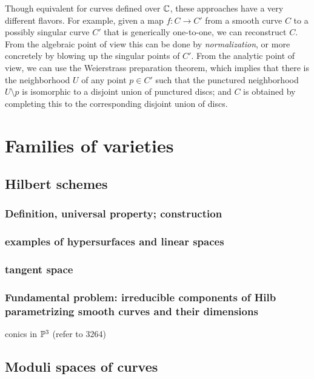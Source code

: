 Though equivalent for curves defined over ${\mathbb C}$, these approaches have a very different flavors. For example,
given a map  $f: C\to C'$ from a smooth curve $C$ to a possibly singular curve $C'$ that is generically one-to-one, we can reconstruct $C$.
From the algebraic point of view this can be done by \emph{normalization}, or more concretely by blowing up the singular points of $C'$. From the analytic point of view, we can use the Weierstrass preparation theorem, which implies that there is the neighborhood $U$ of any point $p\in C'$ such that the punctured neighborhood $U \setminus p$ is isomorphic to a disjoint union of punctured discs; and $C$ is obtained by completing this to the corresponding disjoint union of discs.

\section{Families of varieties}

\subsection{Hilbert schemes}

\subsubsection{Definition, universal property; construction}

\subsubsection{examples of hypersurfaces and linear spaces}

\subsubsection{tangent space}

\subsubsection{Fundamental problem: irreducible components of Hilb parametrizing smooth curves and their dimensions}

\begin{example}
conics in ${\mathbb P}^3$ (refer to 3264)
\end{example}

\subsection{Moduli spaces of curves}

